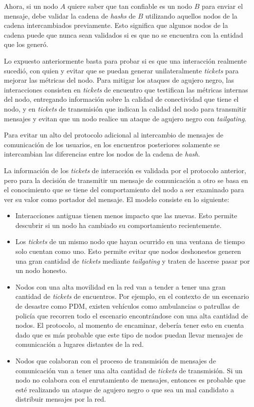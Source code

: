 Ahora, si un nodo $A$ quiere saber que tan confiable es un nodo $B$ para enviar
el mensaje, debe validar la cadena de \textit{hashs} de $B$ utilizando aquellos
nodos de la cadena intercambiados previamente. Esto significa que algunos nodos
de la cadena puede que nunca sean validados si es que no se encuentra con la
entidad que los generó.

Lo expuesto anteriormente basta para probar si es que una interacción realmente
sucedió, con quien y evitar que se puedan generar unilateralmente
\textit{tickets} para mejorar las métricas del nodo. Para mitigar los ataques de
agujero negro, las interacciones consisten en \textit{tickets} de encuentro que
testifican las métricas internas del nodo, entregando información sobre la
calidad de conectividad que tiene el nodo, y en \textit{tickets} de transmisión
que indican la calidad del nodo para transmitir mensajes y evitan que un nodo
realice un ataque de agujero negro con \textit{tailgating}.

Para evitar un alto \overhead{} del protocolo adicional al intercambio de
mensajes de comunicación de los usuarios, en los encuentros posteriores
solamente se intercambian las diferencias entre los nodos de la cadena
de \textit{hash}.



\newpage
{}
La información de los \textit{tickets} de interacción es validada por el
protocolo anterior, pero para la decisión de transmitir un mensaje de
comunicación a otro se basa en el conocimiento que se tiene del comportamiento
del nodo a ser examinado para ver su valor como portador del mensaje. El modelo
consiste en lo siguiente:

\begin{itemize}
  \item Interacciones antiguas tienen menos impacto que las nuevas. Esto permite
    descubrir si un nodo ha cambiado su comportamiento recientemente.
  \item Los \textit{tickets} de un mismo nodo que hayan ocurrido en una ventana
    de tiempo solo cuentan como uno. Esto permite evitar que nodos deshonestos
    generen una gran cantidad de \textit{tickets} mediante \textit{tailgating} y
    traten de hacerse pasar por un nodo honesto.
  \item Nodos con una alta movilidad en la red van a tender a tener una gran
    cantidad de \textit{tickets} de encuentros. Por ejemplo, en el contexto de
    un escenario de desastre como PDM, existen vehículos como ambulancias o
    patrullas de policía que recorren todo el escenario encontrándose con una
    alta cantidad de nodos. El protocolo, al momento de encaminar, debería tener
    esto en cuenta dado que es más probable que este tipo de nodos puedan llevar
    mensajes de comunicación a lugares distantes de la red.
  \item Nodos que colaboran con el proceso de transmisión de mensajes de
    comunicación van a tener una alta cantidad de \textit{tickets} de
    transmisión. Si un nodo no colabora con el enrutamiento de mensajes,
    entonces es probable que esté realizando un ataque de agujero negro o que
    sea un mal candidato a distribuir mensajes por la red.
\end{itemize}

